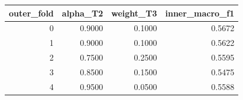 \begin{tabular}{rrrr}
\toprule
outer_fold & alpha_T2 & weight_T3 & inner_macro_f1 \\
\midrule
0 & 0.9000 & 0.1000 & 0.5672 \\
1 & 0.9000 & 0.1000 & 0.5622 \\
2 & 0.7500 & 0.2500 & 0.5595 \\
3 & 0.8500 & 0.1500 & 0.5475 \\
4 & 0.9500 & 0.0500 & 0.5588 \\
\bottomrule
\end{tabular}
